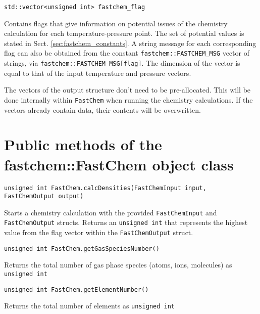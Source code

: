 \documentclass[numbers=noenddot]{aux/fcmanual}
\newcommand{\fc}{\texttt{FastChem}\xspace}
\begin{document}
\bigbreak

\lstinline!std::vector<unsigned int> fastchem_flag!
\begin{addmargin}[25pt]{0pt}
  Contains flags that give information on potential issues of the chemistry calculation for each temperature-pressure point. The set of potential values is stated in Sect. \ref{sec:fastchem_constants}. A string message for each corresponding flag can also be obtained from the constant \lstinline!fastchem::FASTCHEM_MSG! vector of strings, via \lstinline!fastchem::FASTCHEM_MSG[flag]!. The dimension of the vector is equal to that of the input temperature and pressure vectors.
\end{addmargin}

\bigbreak

The vectors of the output structure don't need to be pre-allocated. This will be done internally within \fc when running the chemistry calculations. If the vectors already contain data, their contents will be overwritten.


\section{Public methods of the fastchem::FastChem object class}
\label{sec:fastchem_methods}

\lstinline!unsigned int FastChem.calcDensities(FastChemInput input, FastChemOutput output)!
\begin{addmargin}[25pt]{0pt}
  Starts a chemistry calculation with the provided \lstinline!FastChemInput! and \lstinline!FastChemOutput! structs. Returns an \lstinline!unsigned int! that represents the highest value from the flag vector within the \lstinline!FastChemOutput! struct.
\end{addmargin}

\bigbreak

\lstinline!unsigned int FastChem.getGasSpeciesNumber()!
  \begin{addmargin}[25pt]{0pt}
    Returns the total number of gas phase species (atoms, ions, molecules) as \lstinline!unsigned int!
  \end{addmargin}
  
\bigbreak

\lstinline!unsigned int FastChem.getElementNumber()!
\begin{addmargin}[25pt]{0pt}
  Returns the total number of elements as \lstinline!unsigned int!
\end{addmargin}

\bigbreak
\end{document}
